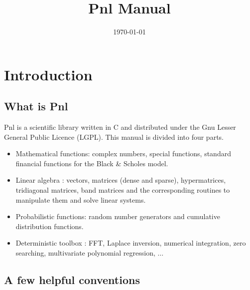 \documentclass[a4paper,11pt,twoside]{article}
\title{Pnl Manual}
\date{\today}
\author{}
\begin{document}
\maketitle
\tableofcontents

\section{Introduction}
\subsection{What is Pnl}

Pnl is a scientific library written in C and distributed under
the Gnu Lesser General Public Licence (LGPL). This manual is divided into four
parts.
\begin{itemize}
\item Mathematical functions: complex numbers, special functions, standard
  financial functions for the Black \& Scholes model.
\item Linear algebra : vectors, matrices (dense and sparse), hypermatrices, tridiagonal matrices,
  band matrices and the corresponding routines to manipulate them and solve linear systems.
\item Probabilistic functions: random number generators and  cumulative
  distribution functions.
\item Deterministic toolbox : FFT, Laplace inversion, numerical integration, zero searching,
  multivariate polynomial regression, $\dots$
\end{itemize}

\subsection{A few helpful conventions}
\end{document}
